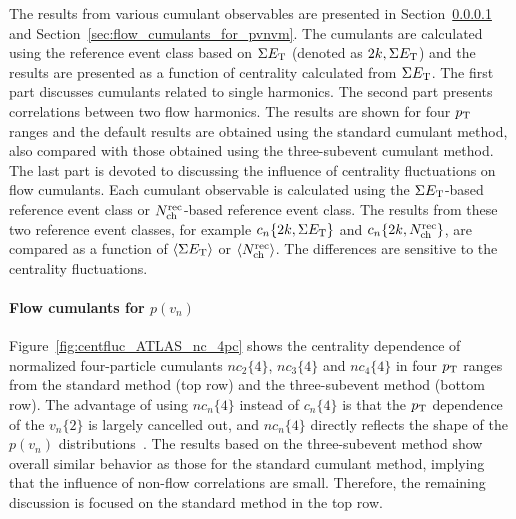 The results from various cumulant observables are presented in Section~\ref{sec:flow_cumulants_for_pvn} and Section~\ref{sec:flow_cumulants_for_pvnvm}. The cumulants are calculated using the reference event class based on $\Sigma E_\text{T}$ (denoted as ${2k, \Sigma E_\text{T}}$) and the results are presented as a function of centrality calculated from $\Sigma E_\text{T}$. The first part discusses cumulants related to single harmonics. The second part presents correlations between two flow harmonics. The results are shown for four $p_\text{T}$ ranges and the default results are obtained using the standard cumulant method, also compared with those obtained using the three-subevent cumulant method. The last part is devoted to discussing the influence of centrality fluctuations on flow cumulants. Each cumulant observable is calculated using the $\Sigma E_\text{T}$-based reference event class or $N_\text{ch}^\text{rec}$-based reference event class. The results from these two reference event classes, for example $c_n\{2k, \Sigma E_\text{T}\}$ and $c_n\{2k, N_\text{ch}^\text{rec}\}$, are compared as a function of $\left\langle \Sigma E_\text{T}\right\rangle$ or $\left\langle N_\text{ch}^\text{rec}\right\rangle$. The differences are sensitive to the centrality fluctuations.



\paragraph{Flow cumulants for $p(v_n)$}
\label{sec:flow_cumulants_for_pvn}

Figure~\ref{fig:centfluc_ATLAS_nc_4pc} shows the centrality dependence of normalized four-particle cumulants $nc_2\{4\}$, $nc_3\{4\}$ and $nc_4\{4\}$ in four $p_\text{T}$ ranges from the standard method (top row) and the three-subevent method (bottom row). The advantage of using $nc_n\{4\}$ instead of $c_n\{4\}$ is that the $p_\text{T}$ dependence of the $v_n\{2\}$ is largely cancelled out, and $nc_n\{4\}$ directly reflects the shape of the $p(v_n)$ distributions~\cite{Aad:2013xma}. The results based on the three-subevent method show overall similar behavior as those for the standard cumulant method, implying that the influence of non-flow correlations are small. Therefore, the remaining discussion is focused on the standard method in the top row.

